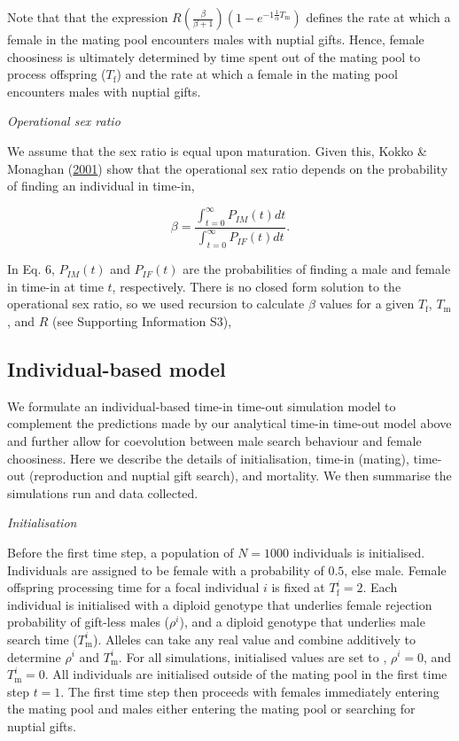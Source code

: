 \documentclass[
]{article}
\begin{document}
Note that that the expression
\(R\left(\frac{\beta}{\beta + 1}\right) \left(1 - e^{-1\frac{1}{\alpha}T_{\mathrm{m}}}\right)\)
defines the rate at which a female in the mating pool encounters males
with nuptial gifts. Hence, female choosiness is ultimately determined by
time spent out of the mating pool to process offspring
(\(T_{\mathrm{f}}\)) and the rate at which a female in the mating pool
encounters males with nuptial gifts.

\emph{Operational sex ratio}

We assume that the sex ratio is equal upon maturation. Given this, Kokko
\& Monaghan (\protect\hyperlink{ref-Kokko2001}{2001}) show that the
operational sex ratio depends on the probability of finding an
individual in time-in,

\[\beta = \frac{\int_{t = 0}^{\infty} P_{IM}(t)dt}{\int_{t = 0}^{\infty} P_{IF}(t)dt}.
\tag{6}
\]

In Eq. 6, \(P_{IM}(t)\) and \(P_{IF}(t)\) are the probabilities of
finding a male and female in time-in at time \(t\), respectively. There
is no closed form solution to the operational sex ratio, so we used
recursion to calculate \(\beta\) values for a given \(T_{\mathrm{f}}\),
\(T_{\mathrm{m}}\), and \(R\) (see Supporting Information S3),

\hypertarget{individual-based-model}{%
\subsection{Individual-based model}\label{individual-based-model}}

We formulate an individual-based time-in time-out simulation model to
complement the predictions made by our analytical time-in time-out model
above and further allow for coevolution between male search behaviour
and female choosiness. Here we describe the details of initialisation,
time-in (mating), time-out (reproduction and nuptial gift search), and
mortality. We then summarise the simulations run and data collected.

\emph{Initialisation}

Before the first time step, a population of \(N = 1000\) individuals is
initialised. Individuals are assigned to be female with a probability of
\(0.5\), else male. Female offspring processing time for a focal
individual \(i\) is fixed at \(T^{i}_{\mathrm{f}} = 2\). Each individual
is initialised with a diploid genotype that underlies female rejection
probability of gift-less males (\(\rho^{i}\)), and a diploid genotype
that underlies male search time (\(T^{i}_{\mathrm{m}}\)). Alleles can
take any real value and combine additively to determine \(\rho^{i}\) and
\(T^{i}_{\mathrm{m}}\). For all simulations, initialised values are set
to , \(\rho^{i} = 0\), and \(T^{i}_{\mathrm{m}} = 0\). All individuals
are initialised outside of the mating pool in the first time step
\(t = 1\). The first time step then proceeds with females immediately
entering the mating pool and males either entering the mating pool or
searching for nuptial gifts.
\end{document}
